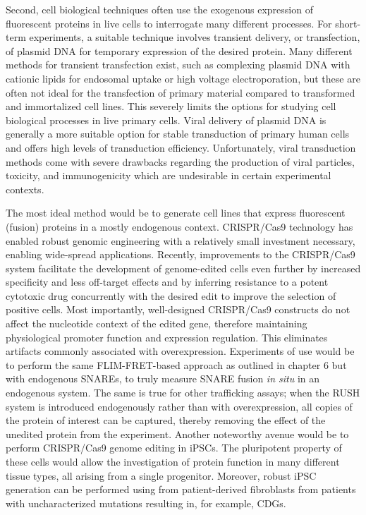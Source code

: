 Second, cell biological techniques often use the exogenous expression of fluorescent proteins in live cells to interrogate many different processes. For short-term experiments, a suitable technique involves transient delivery, or transfection, of plasmid DNA for temporary expression of the desired protein. Many different methods for transient transfection exist, such as complexing plasmid DNA with cationic lipids for endosomal uptake\cite{luo_synthetic_2000,lonez_cationic_2008} or high voltage electroporation\cite{luo_directing_2019}, but these are often not ideal for the transfection of primary material compared to transformed and immortalized cell lines\cite{yamano_comparison_2010,maurisse_comparative_2010}. This severely limits the options for studying cell biological processes in live primary cells. Viral delivery of plasmid DNA is generally a more suitable option for stable transduction of primary human cells and offers high levels of transduction efficiency. Unfortunately, viral transduction methods come with severe drawbacks regarding the production of viral particles, toxicity, and immunogenicity which are undesirable in certain experimental contexts\cite{luo_synthetic_2000,anderson_human_1998,crystal_transfer_1995,tripathy_immune_1996}.

The most ideal method would be to generate cell lines that express fluorescent (fusion) proteins in a mostly endogenous context. CRISPR/Cas9 technology has enabled robust genomic engineering with a relatively small investment necessary, enabling wide-spread applications\cite{hsu_development_2014,cho_targeted_2013,cong_multiplex_2013,jinek_programmable_2012}. Recently, improvements to the CRISPR/Cas9 system facilitate the development of genome-edited cells even further by increased specificity and less off-target effects\cite{slaymaker_rationally_2016} and by inferring resistance to a potent cytotoxic drug concurrently with the desired edit to improve the selection of positive cells\cite{agudelo_marker-free_2017}. Most importantly, well-designed CRISPR/Cas9 constructs do not affect the nucleotide context of the edited gene, therefore maintaining physiological promoter function and expression regulation. This eliminates artifacts commonly associated with overexpression\cite{ratz_crisprcas9-mediated_2015,ali_optimizing_2018}. Experiments of use would be to perform the same FLIM-FRET-based approach as outlined in chapter 6 but with endogenous SNAREs, to truly measure SNARE fusion \emph{in situ} in an endogenous system. The same is true for other trafficking assays; when the RUSH system is introduced endogenously rather than with overexpression, all copies of the protein of interest can be captured, thereby removing the effect of the unedited protein from the experiment. Another noteworthy avenue would be to perform CRISPR/Cas9 genome editing in iPSCs\cite{klimanskaya_human_2006,takahashi_induction_2006}. The pluripotent property of these cells would allow the investigation of protein function in many different tissue types, all arising from a single progenitor. Moreover, robust iPSC generation can be performed using from patient-derived fibroblasts from patients with uncharacterized mutations resulting in, for example, CDGs. 

